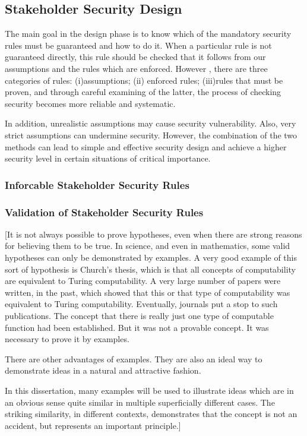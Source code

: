 \subsection{Stakeholder Security Design}\label{stsecdsgn} 
The main goal in the design phase is to know which of the mandatory security rules must be guaranteed and how to do it. When a particular  rule is not guaranteed directly,  this rule should be checked  that it follows from our assumptions and the rules which are enforced. However , there are three categories of rules: (i)assumptions; (ii) enforced rules; (iii)rules that must be proven, and through careful examining of the latter, the process of checking security becomes more reliable and systematic.

In addition, unrealistic assumptions may cause security vulnerability. Also, very strict assumptions can undermine security. However, the combination of the two methods can lead to simple and effective security design and achieve a higher security level in certain situations of critical importance.
\subsubsection{Inforcable Stakeholder Security Rules}\label{Instsecrul}
\subsubsection{Validation of Stakeholder Security Rules}\label{vlstsecrul}

[It is not always possible to prove hypotheses, even when there are strong reasons for believing
them to be true. In science, and even in mathematics, some valid hypotheses can only be demonstrated
by examples. A very good example of this sort of hypothesis is Church's thesis, which is that
all concepts of computability are equivalent to Turing computability. A very large number of papers
were written, in the past, which showed that this or that type of computability was equivalent to
Turing computability. Eventually, journals put a stop to such publications. The concept that there is
really just one type of computable function had been established. But it was not a provable concept.
It was necessary to prove it by examples.

There are other advantages of examples. They are also an ideal way to demonstrate ideas in a 
natural and attractive fashion.

In this dissertation, many examples will be used to illustrate ideas which are in an obvious
sense quite similar in multiple superficially different cases. The striking similarity, in
different contexts, demonstrates that the concept is not an accident, but represents an important
principle.]




\iffalse
\section{A social contract for cyberspace}
We proposed a social contract for cyberspace that can manage Stakeholders'
policies and ensure their respect by their owners.
\fi

\fi